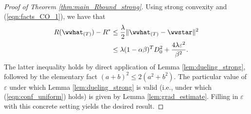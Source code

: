 \documentclass[11pt,oneside]{article}
\theoremstyle{definition} \newtheorem{defn}{Definition}       %
\theoremstyle{plain} \newtheorem{prop}[defn]{Proposition}           %
\theoremstyle{plain} \newtheorem{thm}[defn]{Theorem}                %
\theoremstyle{plain} \newtheorem{lem}[defn]{Lemma}                  %
\theoremstyle{plain} \newtheorem{cor}[defn]{Corollary}              %
\theoremstyle{remark} \newtheorem{rmk}[defn]{Remark}                %
\theoremstyle{remark} \newtheorem{ex}[defn]{Example}                %
\begin{document}
\begin{proof}[Proof of Theorem \ref{thm:main_Rbound_strong}]
Using strong convexity and (\ref{eqn:facts_CO_1}), we have that
%
\begin{align*}
R(\wwhat_{(T)}) - R^{\ast} & \leq \frac{\lambda}{2}\|\wwhat_{(T)} - \wwstar\|^{2}\\
& \leq \lambda(1-\alpha\beta)^{T}D_{0}^{2} + \frac{4\lambda\varepsilon^{2}}{\beta^{2}}.
\end{align*}
%
The latter inequality holds by direct application of Lemma \ref{lem:dueling_strong}, followed by the elementary fact $(a+b)^{2} \leq 2(a^{2}+b^{2})$. The particular value of $\varepsilon$ under which Lemma \ref{lem:dueling_strong} is valid (i.e., under which (\ref{eqn:conf_uniform}) holds) is given by Lemma \ref{lem:grad_estimate}. Filling in $\varepsilon$ with this concrete setting yields the desired result.
\end{proof}
\end{document}
